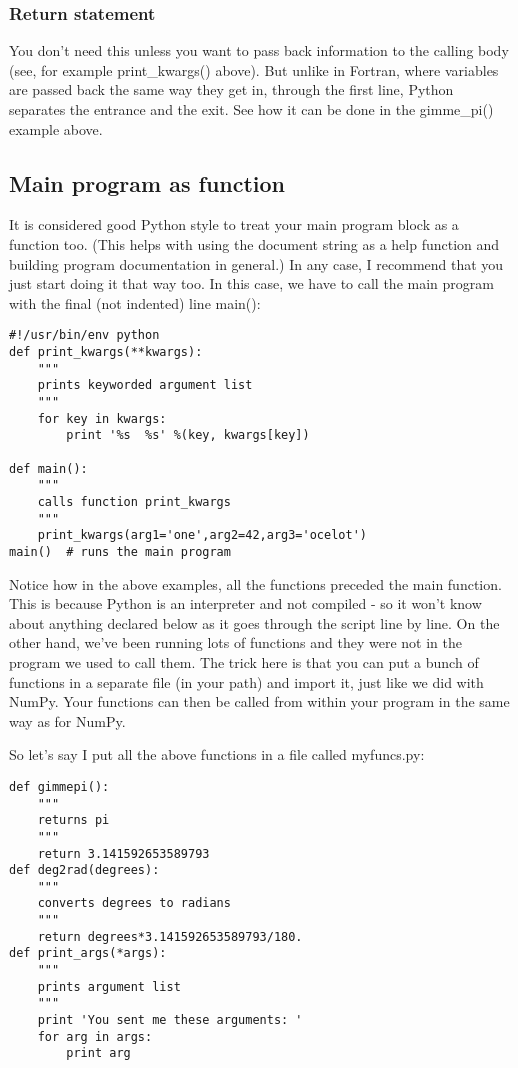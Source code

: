{ \subsubsection{Return statement}
 You don't need this unless you want to pass back information to the calling body (see, for example {\color{blue}print\_kwargs()} above).  But unlike in Fortran, where variables are passed back the same way they get in, through the first line, Python separates the entrance and the exit.  See how it can be done in the {\color{blue}gimme\_pi()} example above.    
 
 \subsection{Main program as function}
 
 It is considered good Python style to treat your main program block as a function too.  (This helps with using the document string as a help function and building program documentation in general.)  In any case, I recommend that you just start doing it that way too.  In this case,  we have to call the main program with the final (not indented) line {\color{blue}main()}:

{\singlespacing \color{blue} \begin{verbatim}
#!/usr/bin/env python
def print_kwargs(**kwargs):
    """
    prints keyworded argument list
    """
    for key in kwargs:
        print '%s  %s' %(key, kwargs[key])
     
def main():
    """
    calls function print_kwargs
    """
    print_kwargs(arg1='one',arg2=42,arg3='ocelot')
main()  # runs the main program
\end{verbatim}}

Notice how in the above examples, all the functions preceded the main function.  This is because Python is an interpreter and not compiled - so it won't know about anything declared below as it goes through the script line by line.   On the other hand, we've been running lots of functions and they were not in the program we used to call them.  The trick here is that 
you can put a bunch of functions in a separate file (in your path) and import it, just like we did with {\color{blue}NumPy}.  Your functions can then be called from within your program  in the same way as for {\color{blue}NumPy}.  

So let's say I put all the above functions in a file called {\color{blue}myfuncs.py}:

{\singlespacing \color{blue} \begin{verbatim}
def gimmepi():  
    """
    returns pi
    """
    return 3.141592653589793
def deg2rad(degrees):  
    """
    converts degrees to radians
    """
    return degrees*3.141592653589793/180.
def print_args(*args):
    """
    prints argument list
    """
    print 'You sent me these arguments: '
    for arg in args:
        print arg
\end{verbatim}}

}
